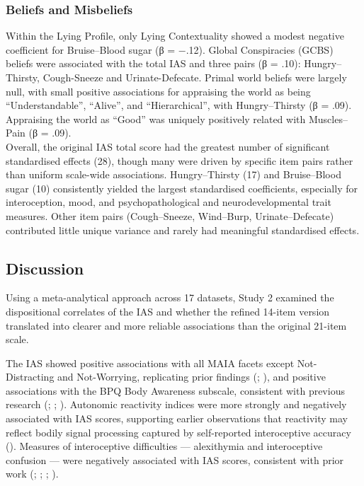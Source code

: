 \documentclass[
  jou,
  floatsintext,
  longtable,
  nolmodern,
  notxfonts,
  notimes,
  colorlinks=true,linkcolor=blue,citecolor=blue,urlcolor=blue]{apa7}
\begin{document}
\subsubsection{Beliefs and Misbeliefs}\label{beliefs-and-misbeliefs-1}

Within the Lying Profile, only Lying Contextuality showed a modest
negative coefficient for Bruise--Blood sugar (β = −.12). Global
Conspiracies (GCBS) beliefs were associated with the total IAS and three
pairs (β = .10): Hungry--Thirsty, Cough-Sneeze and Urinate-Defecate.
Primal world beliefs were largely null, with small positive associations
for appraising the world as being ``Understandable'', ``Alive'', and
``Hierarchical'', with Hungry--Thirsty (β = .09). Appraising the world
as ``Good'' was uniquely positively related with Muscles--Pain (β =
.09).\\
Overall, the original IAS total score had the greatest number of
significant standardised effects (28), though many were driven by
specific item pairs rather than uniform scale-wide associations.
Hungry--Thirsty (17) and Bruise--Blood sugar (10) consistently yielded
the largest standardised coefficients, especially for interoception,
mood, and psychopathological and neurodevelopmental trait measures.
Other item pairs (Cough--Sneeze, Wind--Burp, Urinate--Defecate)
contributed little unique variance and rarely had meaningful
standardised effects.

\subsection{Discussion}\label{discussion-1}

Using a meta-analytical approach across 17 datasets, Study 2 examined
the dispositional correlates of the IAS and whether the refined 14-item
version translated into clearer and more reliable associations than the
original 21-item scale.

The IAS showed positive associations with all MAIA facets except
Not-Distracting and Not-Worrying, replicating prior findings
(;
), and positive associations
with the BPQ Body Awareness subscale, consistent with previous research
(;
;
). Autonomic reactivity
indices were more strongly and negatively associated with IAS scores,
supporting earlier observations that reactivity may reflect bodily
signal processing captured by self-reported interoceptive accuracy
(). Measures of interoceptive
difficulties --- alexithymia and interoceptive confusion --- were
negatively associated with IAS scores, consistent with prior work
(;
;
;
).
\end{document}
